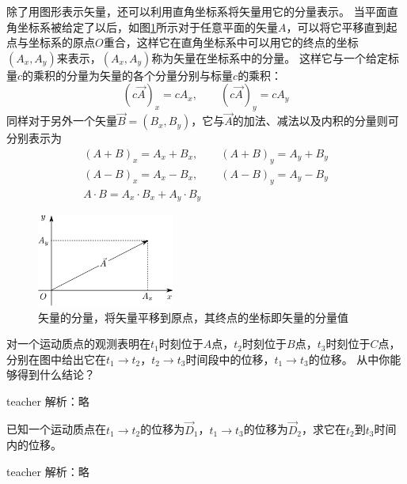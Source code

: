 除了用图形表示矢量，还可以利用直角坐标系将矢量用它的分量表示。
当平面直角坐标系被给定了以后，如图\ref{fig: motion-矢量在坐标系中的分量}所示对于任意平面的矢量$A$，可以将它平移直到起点与坐标系的原点$O$重合，这样它在直角坐标系中可以用它的终点的坐标$(A_x,A_y)$来表示，$(A_x,A_y)$称为矢量在坐标系中的分量。
这样它与一个给定标量$c$的乘积的分量为矢量的各个分量分别与标量$c$的乘积：
\begin{equation}
(c\vec{A})_x = cA_x,\qquad (c\vec{A})_y = cA_y
\end{equation}
同样对于另外一个矢量$\vec{B} = (B_x, B_y)$，它与$\vec{A}$的加法、减法以及内积的分量则可分别表示为
\begin{align}
&(A+B)_x = A_x+B_x, \qquad (A+B)_y = A_y+B_y&\\
&(A-B)_x = A_x-B_x, \qquad (A-B)_y = A_y-B_y&\\
&A\cdot B = A_x\cdot B_x+A_y\cdot B_y&
\end{align}
\begin{figure}[hbtp]
\centering
\includegraphics[width=0.4\textwidth]{images/motion-theory-5.pdf}
\caption{矢量的分量，将矢量平移到原点，其终点的坐标即矢量的分量值}\label{fig: motion-矢量在坐标系中的分量}
\end{figure}

\begin{example}
对一个运动质点的观测表明在$t_1$时刻位于$A$点，$t_2$时刻位于$B$点，$t_3$时刻位于$C$点，分别在图中给出它在$t_1\rightarrow t_2$，$t_2\rightarrow t_3$时间段中的位移，$t_1\rightarrow t_3$的位移。
从中你能够得到什么结论？
\begin{taggedblock}{teacher}
\newline
解析：略
\vspace*{5cm}
\end{taggedblock}
\end{example}

\begin{example}
已知一个运动质点在$t_1\rightarrow t_2$的位移为$\vec{D}_1$，$t_1\rightarrow t_3$的位移为$\vec{D}_2$，求它在$t_2$到$t_3$时间内的位移。
\begin{taggedblock}{teacher}
\newline
解析：略
\vspace*{4cm}
\end{taggedblock}
\end{example}

